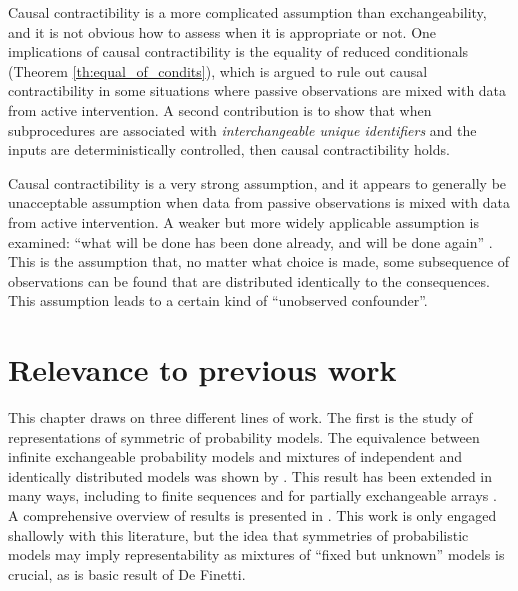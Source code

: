 Causal contractibility is a more complicated assumption than exchangeability, and it is not obvious how to assess when it is appropriate or not. One implications of causal contractibility is the equality of reduced conditionals (Theorem \ref{th:equal_of_condits}), which is argued to rule out causal contractibility in some situations where passive observations are mixed with data from active intervention. A second contribution is to show that when subprocedures are associated with \emph{interchangeable unique identifiers} and the inputs are deterministically controlled, then causal contractibility holds.

Causal contractibility is a very strong assumption, and it appears to generally be unacceptable assumption when data from passive observations is mixed with data from active intervention. A weaker but more widely applicable assumption is examined: ``what will be done has been done already, and will be done again'' . This is the assumption that, no matter what choice is made, some subsequence of observations can be found that are distributed identically to the consequences. This assumption leads to a certain kind of ``unobserved confounder''.

\section{Relevance to previous work}

This chapter draws on three different lines of work. The first is the study of representations of symmetric of probability models. The equivalence between infinite exchangeable probability models and mixtures of independent and identically distributed models was shown by \cite{de_finetti_foresight_1992}. This result has been extended in many ways, including to finite sequences \citet{kerns_definettis_2006,diaconis_finite_1980} and for partially exchangeable arrays \citet{aldous_representations_1981}. A comprehensive overview of results is presented in \citet{kallenberg_probabilistic_2005}. This work is only engaged shallowly with this literature, but the idea that symmetries of probabilistic models may imply representability as mixtures of ``fixed but unknown'' models is crucial, as is basic result of De Finetti.

